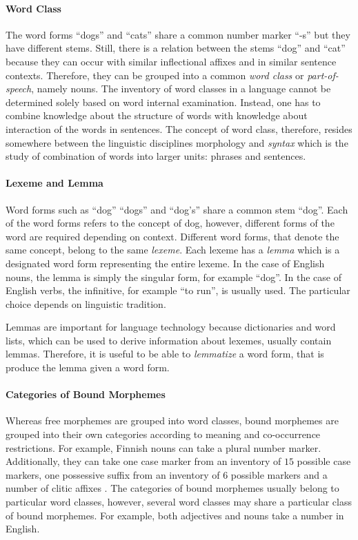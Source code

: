 \paragraph{Word Class} The word forms ``dogs'' and ``cats'' share a
common number marker ``-s'' but they have different stems. Still, there
is a relation between the stems ``dog'' and ``cat'' because they can
occur with similar inflectional affixes and in similar sentence
contexts. Therefore, they can be grouped into a common {\it word
  class} or {\it part-of-speech}, namely nouns.  The inventory of word
classes in a language cannot be determined solely based on word
internal examination. Instead, one has to combine knowledge about the
structure of words with knowledge about interaction of the words in
sentences. The concept of word class, therefore, resides somewhere
between the linguistic disciplines morphology and {\it syntax} which
is the study of combination of words into larger units: phrases and
sentences.

\paragraph{Lexeme and Lemma} Word forms such as ``dog'' ``dogs'' and
``dog's'' share a common stem ``dog''. Each of the word forms refers
to the concept of {\sc dog}, however, different forms of the word are
required depending on context. Different word forms, that denote the
same concept, belong to the same {\it lexeme}. Each lexeme has a {\it
  lemma} which is a designated word form representing the entire
lexeme. In the case of English nouns, the lemma is simply the singular
form, for example ``dog''. In the case of English verbs, the
infinitive, for example ``to run'', is usually used. The particular
choice depends on linguistic tradition. 

Lemmas are important for language technology because dictionaries and
word lists, which can be used to derive information about lexemes,
usually contain lemmas. Therefore, it is useful to be able to {\it
  lemmatize} a word form, that is produce the lemma given a word form.

\paragraph{Categories of Bound Morphemes} Whereas free morphemes are
grouped into word classes, bound morphemes are grouped into their own
categories according to meaning and co-occurrence restrictions. For
example, Finnish nouns can take a plural number
marker. Additionally, they can take one case marker from an inventory
of $15$ possible case markers, one possessive suffix from an inventory
of $6$ possible markers and a number of clitic affixes
\citep{Hakulinen2004}. The categories of bound morphemes usually
belong to particular word classes, however, several word classes may
share a particular class of bound morphemes. For example, both
adjectives and nouns take a number in English.

